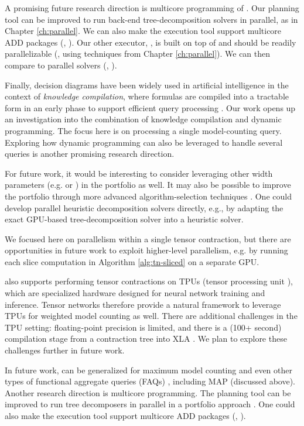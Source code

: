 A promising future research direction is multicore programming of \Dpmc{}.
Our planning tool \Lg{} can be improved to run back-end tree-decomposition solvers in parallel, as in Chapter \ref{ch:parallel}.
We can also make the execution tool \Dmc{} support multicore ADD packages (\eg, \sylvan{} \cite{van2015sylvan}).
Our other executor, \Tensor{}, is built on top of \Numpy{} \cite{numpy} and should be readily parallelizable (\eg, using techniques from Chapter \ref{ch:parallel}).
We can then compare \Dpmc{} to parallel solvers (\eg, \cite{dal2018parallel,BSB15}).

Finally, decision diagrams have been widely used in artificial intelligence in the context of \emph{knowledge compilation}, where formulas are compiled into a tractable form in an early phase to support efficient query processing \cite{koriche2013knowledge,LM17,darwiche2004new,OD15}.
Our work opens up an investigation into the combination of knowledge compilation and dynamic programming.
The focus here is on processing a single model-counting query.
Exploring how dynamic programming can also be leveraged to handle several queries is another promising research direction.



For future work, it would be interesting to consider leveraging other width parameters (e.g. \cite{AGG07} or \cite{GS17}) in the portfolio as well. It may also be possible to improve the portfolio through more advanced algorithm-selection techniques \cite{HHLKS09,XHHL12}. One could develop parallel heuristic decomposition solvers directly, e.g., by adapting the exact GPU-based tree-decomposition solver \cite{VB17} into a heuristic solver.

We focused here on parallelism within a single tensor contraction, but there are opportunities in future work to exploit higher-level parallelism, e.g. by running each slice computation in Algorithm \ref{alg:tn-sliced} on a separate GPU. 

 also supports performing tensor contractions on TPUs (tensor processing unit \cite{JYPPABBBBB17}), which are specialized hardware designed for neural network training and inference. Tensor networks therefore provide a natural framework to leverage TPUs for weighted model counting as well. There are additional challenges in the TPU setting: floating-point precision is limited, and there is a (100+ second) compilation stage from a contraction tree into XLA \cite{XLA}. We plan to explore these challenges further in future work.


In future work, \procount{} can be generalized for maximum model counting \cite{fremont2017maximum} and even other types of functional aggregate queries (FAQs) \cite{KNR16}, including MAP (discussed above). Another research direction is multicore programming. The planning tool \Lg{} can be improved to run tree decomposers in parallel \cite{dudek2020parallel} in a portfolio approach \cite{XHHL08}. One could also make the execution tool \Dmc{} support multicore ADD packages (\eg, \sylvan{} \cite{van2015sylvan}).
